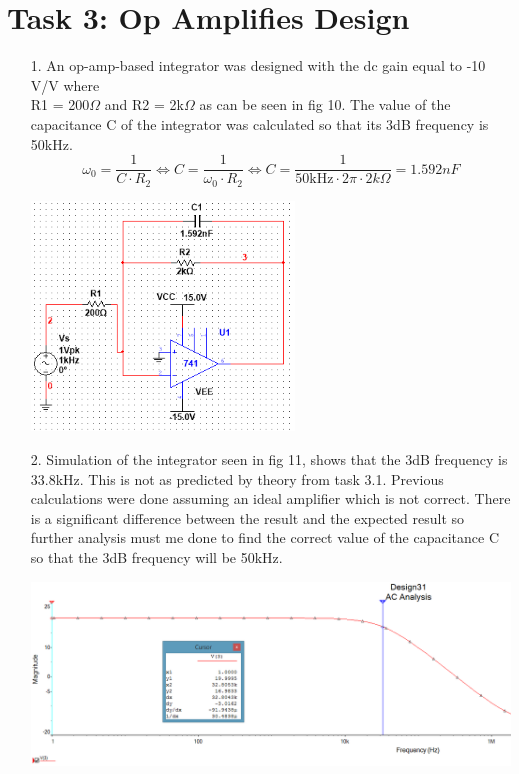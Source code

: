 \documentclass[11pt,a4paper]{article}
\begin{document}
\section*{Task 3: Op Amplifies Design}

\begin{enumerate}
  \item[1.]
  An op-amp-based integrator was designed with the dc gain equal to -10 V/V where \\R1 = 200$\Omega$ and R2 = 2k$\Omega$ as can be seen in fig 10. The value of the capacitance C of the integrator was calculated so that its 3dB frequency is 50kHz. %
$$\omega_0 = \frac{1}{C\cdot R_2} \Leftrightarrow C = \frac{1}{\omega_0 \cdot R_2} \Leftrightarrow C  = \frac{1}{50\text{kHz}\cdot 2\pi \cdot 2k\Omega} = 1.592 nF $$
  \begin{minipage}{\linewidth}
    	\centering       
        \includegraphics[width=7cm]{Task3_1.png}
    \end{minipage}
  \item[2.]
  Simulation of the integrator seen in fig 11, shows that the 3dB frequency is 33.8kHz. This is not as predicted by theory from task 3.1. Previous calculations were done assuming an ideal amplifier which is not correct. There is a significant difference between the result and the expected result so further analysis must me done to find the correct value of the capacitance C so that the 3dB frequency will be 50kHz.\\
  \begin{minipage}{\linewidth}
    	\centering       
        \includegraphics[width=14cm]{Task3_2.png}

\end{minipage}
\end{enumerate}
\end{document}
